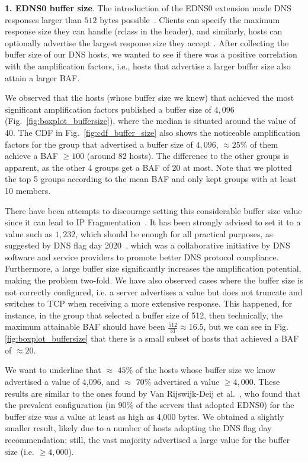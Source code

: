  \noindent \textbf{1. EDNS0 buffer size}. The introduction of the EDNS0 extension made DNS responses larger than $512$ bytes possible~\cite{rfc6891}. Clients can specify the maximum response size they can handle (rclass in the header), and similarly, hosts can optionally advertise the largest response size they accept \cite{edns0-primer}. After collecting the buffer size of our DNS hosts, we wanted to see if there was a positive correlation with the amplification factors, i.e., hosts that advertise a larger buffer size also attain a larger BAF. 

 We observed that the hosts (whose buffer size we knew) that achieved the most significant amplification factors published a buffer size of $4,096$ (Fig.~\ref{fig:boxplot_buffersize}), where the median is situated around the value of 40. The CDF in Fig.~\ref{fig:cdf_buffer_size} also shows the noticeable amplification factors for the group that advertised a buffer size of $4,096$, $\approx 25\%$ of them achieve a BAF $\geq 100$ (around 82 hosts). The difference to the other groups is apparent, as the other 4 groups get a BAF of 20 at most. Note that we plotted the top 5 groups according to the mean BAF and only kept groups with at least 10 members. 

 There have been attempts to discourage setting this considerable buffer size value since it can lead to IP Fragmentation~\cite{dnsflagday}. It has been strongly advised to set it to a value such as $1,232$, which should be enough for all practical purposes, as suggested by DNS flag day 2020~\cite{dnsflagday}, which was a collaborative initiative by DNS software and service providers to promote better DNS protocol compliance. Furthermore, a large buffer size significantly increases the amplification potential, making the problem two-fold. We have also observed cases where the buffer size is not correctly configured, i.e. a server advertises a value but does not truncate and switches to TCP when receiving a more extensive response. This happened, for instance, in the group that selected a buffer size of 512, then technically, the maximum attainable BAF should have been $\frac{512}{31} \approx 16.5$, but we can see in Fig. \ref{fig:boxplot_buffersize} that there is a small subset of hosts that achieved a BAF of $\approx 20$. 

 We want to underline that $\approx$ $45\%$ of the hosts whose buffer size we know advertised a value of 4,096, and $\approx$ $70\%$ advertised a value $\geq 4,000$. These results are similar to the ones found by Van Rijswijk-Deij et al.~\cite{van_rijswijk-deij_dnssec_2014}, who found that the prevalent configuration (in 90\% of the servers that adopted EDNS0) for the buffer size was a value at least as high as 4,000 bytes. We obtained a slightly smaller result, likely due to a number of hosts adopting the DNS flag day recommendation; still, the vast majority advertised a large value for the buffer size (i.e. $\geq 4,000$).



